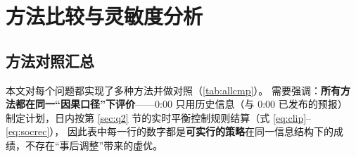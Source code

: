 \section{方法比较与灵敏度分析}
\label{sec:compare}

\subsection{方法对照汇总}

本文对每个问题都实现了多种方法并做对照（\cref{tab:allcmp}\nobreak）\nobreak。
需要强调\nobreak：\textbf{所有方法都在同一“因果口径\nobreak”下评价}——0:00 只用历史信息（与 0:00 已发布的预报\nobreak）
制定计划\nobreak，日内按第 \ref{sec:q2} 节的实时平衡控制规则结算（式 \eqref{eq:clip}--\eqref{eq:socrec}\nobreak）\nobreak，
因此表中每一行的数字都是\textbf{可实行的策略}在同一信息结构下的成绩\nobreak，不存在“事后调整\nobreak”带来的虚优\nobreak。

